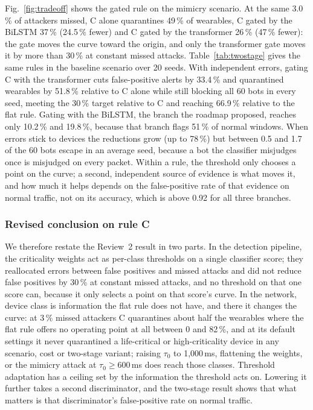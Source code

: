 Fig.~\ref{fig:tradeoff} shows the gated rule on the mimicry scenario. At the same 3.0\,\% of attackers missed, C alone quarantines 49\,\% of wearables, C gated by the BiLSTM 37\,\% (24.5\,\% fewer) and C gated by the transformer 26\,\% (47\,\% fewer): the gate moves the curve toward the origin, and only the transformer gate moves it by more than 30\,\% at constant missed attacks. Table~\ref{tab:twostage} gives the same rules in the baseline scenario over 20 seeds. With independent errors, gating C with the transformer cuts false-positive alerts by 33.4\,\% and quarantined wearables by 51.8\,\% relative to C alone while still blocking all 60 bots in every seed, meeting the 30\,\% target relative to C and reaching 66.9\,\% relative to the flat rule. Gating with the BiLSTM, the branch the roadmap proposed, reaches only 10.2\,\% and 19.8\,\%, because that branch flags 51\,\% of normal windows. When errors stick to devices the reductions grow (up to 78\,\%) but between 0.5 and 1.7 of the 60 bots escape in an average seed, because a bot the classifier misjudges once is misjudged on every packet. Within a rule, the threshold only chooses a point on the curve; a second, independent source of evidence is what moves it, and how much it helps depends on the false-positive rate of that evidence on normal traffic, not on its accuracy, which is above 0.92 for all three branches.

\subsubsection{Revised conclusion on rule C}
We therefore restate the Review~2 result in two parts. In the detection pipeline, the criticality weights act as per-class thresholds on a single classifier score; they reallocated errors between false positives and missed attacks and did not reduce false positives by 30\,\% at constant missed attacks, and no threshold on that one score can, because it only selects a point on that score's curve. In the network, device class is information the flat rule does not have, and there it changes the curve: at 3\,\% missed attackers C quarantines about half the wearables where the flat rule offers no operating point at all between 0 and 82\,\%, and at its default settings it never quarantined a life-critical or high-criticality device in any scenario, cost or two-stage variant; raising $\tau_0$ to 1,000\,ms, flattening the weights, or the mimicry attack at $\tau_0 \ge 600$\,ms does reach those classes. Threshold adaptation has a ceiling set by the information the threshold acts on. Lowering it further takes a second discriminator, and the two-stage result shows that what matters is that discriminator's false-positive rate on normal traffic.
